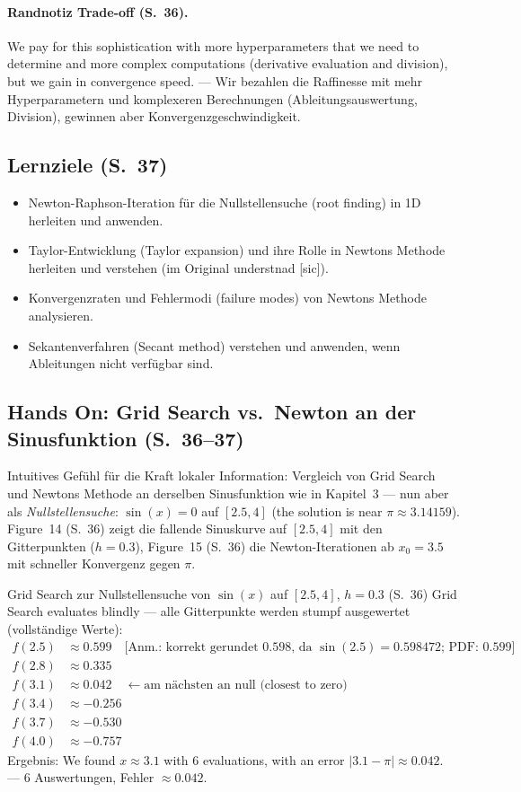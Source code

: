 \paragraph{Randnotiz Trade-off (S.~36).} \glqq We pay for this sophistication with more hyperparameters that we need to determine and more complex computations (derivative evaluation and division), but we gain in convergence speed.\grqq{} — Wir bezahlen die Raffinesse mit mehr Hyperparametern und komplexeren Berechnungen (Ableitungsauswertung, Division), gewinnen aber Konvergenzgeschwindigkeit.

\subsection{Lernziele (S.~37)}
\begin{itemize}[nosep]
  \item Newton-Raphson-Iteration für die Nullstellensuche (root finding) in 1D herleiten und anwenden.
  \item Taylor-Entwicklung (Taylor expansion) und ihre Rolle in Newtons Methode herleiten und verstehen (im Original \glqq understnad\grqq{} [sic]).
  \item Konvergenzraten und Fehlermodi (failure modes) von Newtons Methode analysieren.
  \item Sekantenverfahren (Secant method) verstehen und anwenden, wenn Ableitungen nicht verfügbar sind.
\end{itemize}

\subsection{Hands On: Grid Search vs.\ Newton an der Sinusfunktion (S.~36--37)}
Intuitives Gefühl für die Kraft lokaler Information: Vergleich von Grid Search und Newtons Methode an derselben Sinusfunktion wie in Kapitel~3 — nun aber als \emph{Nullstellensuche}: $\sin(x) = 0$ auf $[2.5, 4]$ (\glqq the solution is near $\pi \approx 3.14159$\grqq). Figure~14 (S.~36) zeigt die fallende Sinuskurve auf $[2.5,4]$ mit den Gitterpunkten ($h=0.3$), Figure~15 (S.~36) die Newton-Iterationen ab $x_0 = 3.5$ mit schneller Konvergenz gegen $\pi$.

\begin{bspbox}{Grid Search zur Nullstellensuche von $\sin(x)$ auf $[2.5,4]$, $h=0.3$ (S.~36)}
Grid Search \glqq evaluates blindly\grqq{} — alle Gitterpunkte werden stumpf ausgewertet (vollständige Werte):
\begin{align*}
f(2.5) &\approx 0.599 \quad \text{[Anm.: korrekt gerundet $0.598$, da $\sin(2.5) = 0.598472$; PDF: $0.599$]} \\
f(2.8) &\approx 0.335 \\
f(3.1) &\approx 0.042 \quad \leftarrow \text{am nächsten an null (closest to zero)} \\
f(3.4) &\approx -0.256 \\
f(3.7) &\approx -0.530 \\
f(4.0) &\approx -0.757
\end{align*}
Ergebnis: \glqq We found $x \approx 3.1$ with 6 evaluations, with an error $|3.1 - \pi| \approx 0.042$.\grqq{} — 6 Auswertungen, Fehler $\approx 0.042$.
\end{bspbox}

